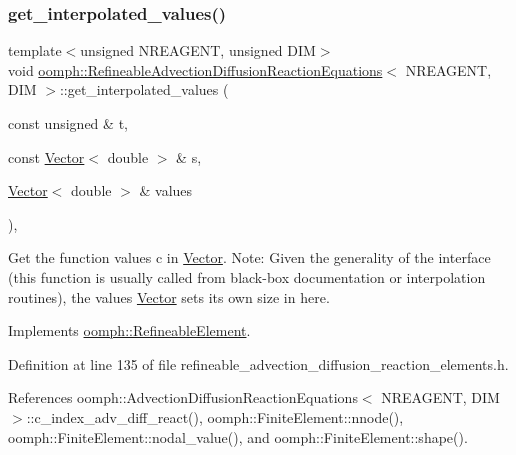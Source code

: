 \subsubsection{\texorpdfstring{get\+\_\+interpolated\+\_\+values()}{get\_interpolated\_values()}\hspace{0.1cm}{\footnotesize\ttfamily [2/2]}}
{\footnotesize\ttfamily template$<$unsigned N\+R\+E\+A\+G\+E\+NT, unsigned D\+IM$>$ \\
void \hyperlink{classoomph_1_1RefineableAdvectionDiffusionReactionEquations}{oomph\+::\+Refineable\+Advection\+Diffusion\+Reaction\+Equations}$<$ N\+R\+E\+A\+G\+E\+NT, D\+IM $>$\+::get\+\_\+interpolated\+\_\+values (\begin{DoxyParamCaption}\item[{const unsigned \&}]{t,  }\item[{const \hyperlink{classoomph_1_1Vector}{Vector}$<$ double $>$ \&}]{s,  }\item[{\hyperlink{classoomph_1_1Vector}{Vector}$<$ double $>$ \&}]{values }\end{DoxyParamCaption})\hspace{0.3cm}{\ttfamily [inline]}, {\ttfamily [virtual]}}



Get the function values c in \hyperlink{classoomph_1_1Vector}{Vector}. Note\+: Given the generality of the interface (this function is usually called from black-\/box documentation or interpolation routines), the values \hyperlink{classoomph_1_1Vector}{Vector} sets its own size in here. 



Implements \hyperlink{classoomph_1_1RefineableElement_ada6f0efe831ffefb1d2829ce01d45bfc}{oomph\+::\+Refineable\+Element}.



Definition at line 135 of file refineable\+\_\+advection\+\_\+diffusion\+\_\+reaction\+\_\+elements.\+h.



References oomph\+::\+Advection\+Diffusion\+Reaction\+Equations$<$ N\+R\+E\+A\+G\+E\+N\+T, D\+I\+M $>$\+::c\+\_\+index\+\_\+adv\+\_\+diff\+\_\+react(), oomph\+::\+Finite\+Element\+::nnode(), oomph\+::\+Finite\+Element\+::nodal\+\_\+value(), and oomph\+::\+Finite\+Element\+::shape().

\mbox{\label{classoomph_1_1RefineableAdvectionDiffusionReactionEquations_aaebce9418da050917be3deb004adf7c7}} 
